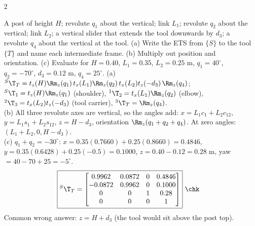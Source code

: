 \begin{multicols}{2}
\begin{examq}
A post of height $H$; revolute $q_1$ about the vertical; link $L_1$; revolute $q_2$ about the vertical; link $L_2$; a vertical slider that extends the tool downwards by $d_3$; a revolute $q_4$ about the vertical at the tool. (a) Write the ETS from $\{S\}$ to the tool $\{T\}$ and name each intermediate frame. (b) Multiply out position and orientation. (c) Evaluate for $H=0.40$, $L_1=0.35$, $L_2=0.25$ m, $q_1=40^\circ$, $q_2=-70^\circ$, $d_3=0.12$ m, $q_4=25^\circ$.
\solution
(a) ${}^S\T_T=t_z(H)\Rm_z(q_1)\,t_x(L_1)\Rm_z(q_2)\,t_x(L_2)t_z(-d_3)\,\Rm_z(q_4)$; ${}^S\T_1=t_z(H)\Rm_z(q_1)$ (shoulder), ${}^1\T_2=t_x(L_1)\Rm_z(q_2)$ (elbow), ${}^2\T_3=t_x(L_2)t_z(-d_3)$ (tool carrier), ${}^3\T_T=\Rm_z(q_4)$.\\
(b) All three revolute axes are vertical, so the angles add: $x=L_1c_1+L_2c_{12}$, $y=L_1s_1+L_2s_{12}$, $z=H-d_3$, orientation $\Rm_z(q_1+q_2+q_4)$. At zero angles: $(L_1{+}L_2,0,H-d_3)$.\\
(c) $q_1+q_2=-30^\circ$: $x=0.35(0.7660)+0.25(0.8660)=0.4846$, $y=0.35(0.6428)+0.25(-0.5)=0.1000$, $z=0.40-0.12=0.28$ m, yaw $=40-70+25=-5^\circ$.
\[\boxed{{}^S\T_T=\begin{bmatrix}0.9962&0.0872&0&0.4846\\-0.0872&0.9962&0&0.1000\\0&0&1&0.28\\0&0&0&1\end{bmatrix}}\ \chk\]
Common wrong answer: $z=H+d_3$ (the tool would sit above the post top).
\end{examq}


\end{multicols}
